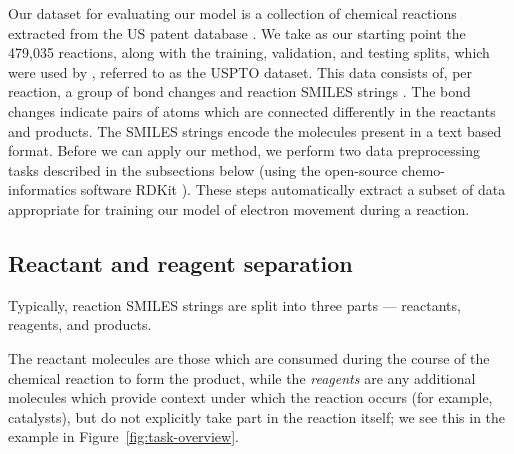 

Our dataset for evaluating our model is a collection of chemical reactions extracted from the US patent database \citep{Lowe2017}.
We take as our starting point the 479,035 reactions, along with the training, validation, and testing splits, 
which were used by \citet{jin2017predicting}, referred to as the USPTO dataset.
This data consists of, per reaction, a group of bond changes and reaction SMILES strings \citep{weininger1988smiles}.
The bond changes indicate pairs of atoms which are connected differently in the reactants and products.
The SMILES strings encode the molecules present in a text based format.
Before we can apply our method, we perform two data preprocessing tasks described in the subsections below
(using the open-source chemo-informatics software RDKit \citep{rdkit}).
These steps automatically
extract a subset of data appropriate for training our model of electron movement during a reaction. 

\subsection{Reactant and reagent separation}

Typically, reaction SMILES strings are split into three parts --- reactants, reagents, and products.

The reactant molecules are those which are consumed during the course of the chemical reaction to form the  product, 
while the {\em reagents} are any additional molecules which provide context under which the reaction occurs (for example, catalysts),
but do not explicitly take part in the reaction itself; we see this in the example in Figure~\ref{fig:task-overview}.

